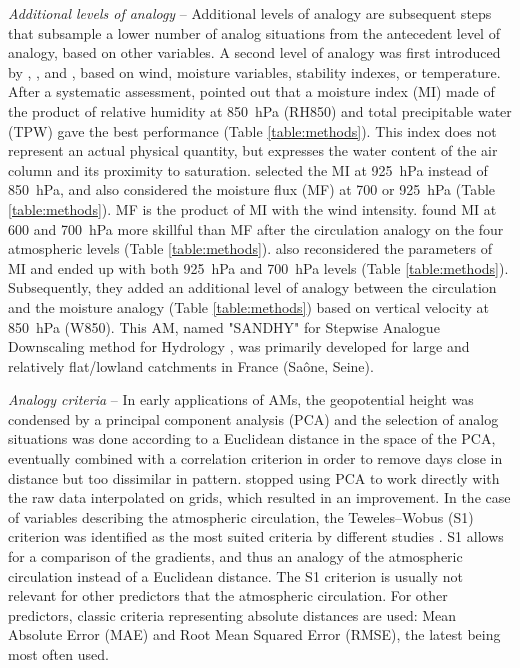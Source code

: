 \documentclass[review]{elsarticle}
\begin{document}
\textit{Additional levels of analogy} -- Additional levels of analogy are subsequent steps that subsample a lower number of analog situations from the antecedent level of analogy, based on other variables. A second level of analogy was first introduced by \citet{Mandon1985}, \citet{Vallee1986}, and \citet{Gibergans-Baguena2007}, based on wind, moisture variables, stability indexes, or temperature. After a systematic assessment, \citet{Bontron2004} pointed out that a moisture index (MI) made of the product of relative humidity at 850~hPa (RH850) and total precipitable water (TPW) gave the best performance (Table \ref{table:methods}). This index does not represent an actual physical quantity, but expresses the water content of the air column and its proximity to saturation. \citet{Marty2010} selected the MI at 925~hPa instead of 850~hPa, and also considered the moisture flux (MF) at 700 or 925~hPa (Table \ref{table:methods}). MF is the product of MI with the wind intensity. \citet{Horton2018a} found MI at 600 and 700~hPa more skillful than MF after the circulation analogy on the four atmospheric levels (Table \ref{table:methods}). \citet{BenDaoud2016} also reconsidered the parameters of MI and ended up with both 925~hPa and 700~hPa levels (Table \ref{table:methods}). Subsequently, they added an additional level of analogy between the circulation and the moisture analogy (Table \ref{table:methods}) based on vertical velocity at 850~hPa (W850). This AM, named "SANDHY" for Stepwise Analogue Downscaling method for Hydrology \citep{BenDaoud2016, Caillouet2016}, was primarily developed for large and relatively flat/lowland catchments in France (Sa\^{o}ne, Seine).

\textit{Analogy criteria} -- In early applications of AMs, the geopotential height was condensed by a principal component analysis (PCA) and the selection of analog situations was done according to a Euclidean distance in the space of the PCA, eventually combined with a correlation criterion in order to remove days close in distance but too dissimilar in pattern. \citet{Guilbaud1997} stopped using PCA to work directly with the raw data interpolated on grids, which resulted in an improvement. In the case of variables describing the atmospheric circulation, the Teweles--Wobus (S1) criterion \citep[Eq. (\ref{eq:S1}), ][]{Teweles1954, Drosdowsky2003} was identified as the most suited criteria by different studies \citep{Wilson1980, Woodcock1980, Guilbaud1998, Bontron2004}. S1 allows for a comparison of the gradients, and thus an analogy of the atmospheric circulation instead of a Euclidean distance. The S1 criterion is usually not relevant for other predictors that the atmospheric circulation. For other predictors, classic criteria representing absolute distances are used: Mean Absolute Error (MAE) and Root Mean Squared Error (RMSE), the latest being most often used.
\end{document}
